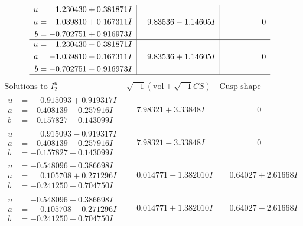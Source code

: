 \documentclass[1p]{elsarticle_modified}
\theoremstyle{definition}
\newcommand{\I}{\sqrt{-1}}
\begin{document}
$$\begin{array}{c|c|c}
\begin{aligned}
u &= \phantom{-}1.230430 + 0.381871 I \\
a &= -1.039810 + 0.167311 I \\
b &= -0.702751 + 0.916973 I\end{aligned}
 & \phantom{-}9.83536 - 1.14605 I & \phantom{-0.000000 } 0 \\ \hline\begin{aligned}
u &= \phantom{-}1.230430 - 0.381871 I \\
a &= -1.039810 - 0.167311 I \\
b &= -0.702751 - 0.916973 I\end{aligned}
 & \phantom{-}9.83536 + 1.14605 I & \phantom{-0.000000 } 0\\
 \hline 
 \end{array}$$\newpage$$\begin{array}{c|c|c}  
\text{Solutions to }I^u_{2}& \I (\text{vol} + \sqrt{-1}CS) & \text{Cusp shape}\\
 \hline 
\begin{aligned}
u &= \phantom{-}0.915093 + 0.919317 I \\
a &= -0.408139 + 0.257916 I \\
b &= -0.157827 + 0.143099 I\end{aligned}
 & \phantom{-}7.98321 + 3.33848 I & \phantom{-0.000000 } 0 \\ \hline\begin{aligned}
u &= \phantom{-}0.915093 - 0.919317 I \\
a &= -0.408139 - 0.257916 I \\
b &= -0.157827 - 0.143099 I\end{aligned}
 & \phantom{-}7.98321 - 3.33848 I & \phantom{-0.000000 } 0 \\ \hline\begin{aligned}
u &= -0.548096 + 0.386698 I \\
a &= \phantom{-}0.105708 + 0.271296 I \\
b &= -0.241250 + 0.704750 I\end{aligned}
 & \phantom{-}0.014771 - 1.382010 I & \phantom{-}0.64027 + 2.61668 I \\ \hline\begin{aligned}
u &= -0.548096 - 0.386698 I \\
a &= \phantom{-}0.105708 - 0.271296 I \\
b &= -0.241250 - 0.704750 I\end{aligned}
 & \phantom{-}0.014771 + 1.382010 I & \phantom{-}0.64027 - 2.61668 I \\ \hline\begin{aligned}

\end{aligned}
\end{array}$$
\end{document}
